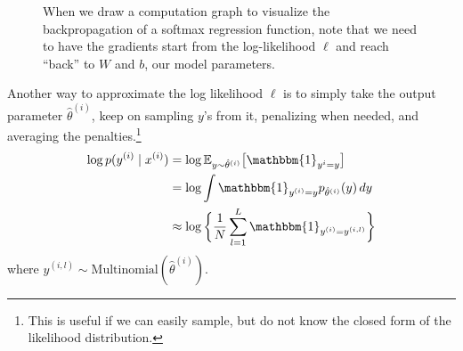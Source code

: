 \begin{example}[Softmax]
\begin{figure}[H]
      \caption{ When we draw a computation graph to visualize the backpropagation of a softmax regression function, note that we need to have the gradients start from the log-likelihood $\ell$ and reach ``back'' to $W$ and $b$, our model parameters. }
      \label{fig:softmax1}
    \end{figure}

    Another way to approximate the log likelihood $\ell$ is to simply take the output parameter $\hat{\theta}^{(i)}$, keep on sampling $y$'s from it, penalizing when needed, and averaging the penalties.\footnote{This is useful if we can easily sample, but do not know the closed form of the likelihood distribution.}
    \begin{align}
      \log p(y^{(i)} \mid x^{(i)}) & = \log \mathbb{E}_{y \sim \hat{\theta}^{(i)}} \big[ \mathbbm{1}_{y^{i} = y} \big] \\
                                   & = \log \int \mathbbm{1}_{y^{(i)} = y} p_{\hat{\theta}^{(i)}} (y) \,dy \\
                                   & \approx \log \bigg\{ \frac{1}{N} \sum_{l=1}^L \mathbbm{1}_{y^{(i)} = y^{(i, l)}} \bigg\}
    \end{align}
    where $y^{(i, l)} \sim \mathrm{Multinomial} (\hat{\theta}^{(i)})$. 


\end{example}

